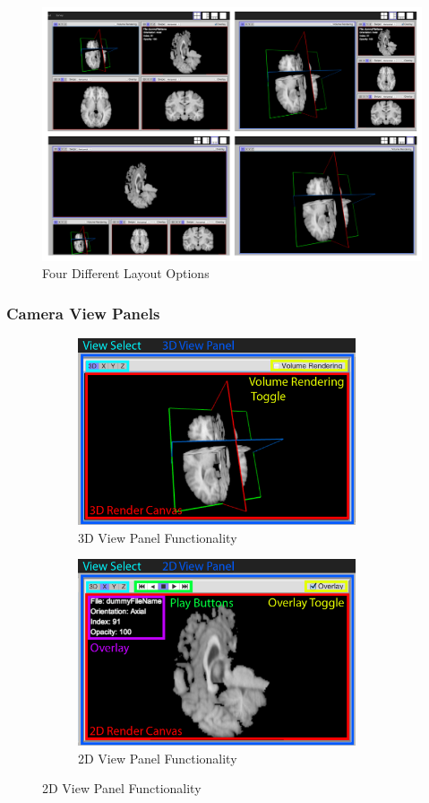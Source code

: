 \documentclass[a4paper,11pt,twoside]{article}
\begin{document}
\begin{figure}[ht!]
\centering
\includegraphics[width=165mm]{graphics/layouts_01.png}
\caption{Four Different Layout Options}
\label{fig:UIdesign1}
\end{figure}


\subsubsection{Camera View Panels}

\begin{figure}
\centering
\begin{subfigure}{.5\textwidth}
  \centering
  \includegraphics[width=82mm]{graphics/features_02b.png}
  \caption{3D View Panel Functionality}
  \label{fig:sub1}
\end{subfigure}%
\begin{subfigure}{.5\textwidth}
  \centering
  \includegraphics[width=82mm]{graphics/features_02.png}
  \caption{2D View Panel Functionality}
  \label{fig:sub2}
\end{subfigure}
\end{figure}
\end{document}
